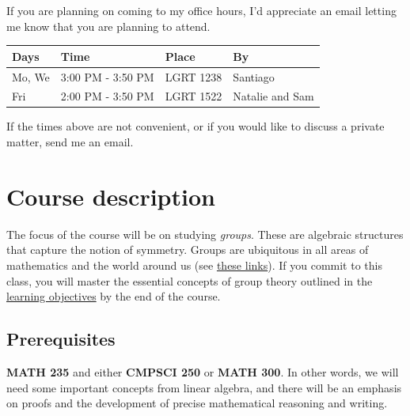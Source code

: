 \documentclass[11pt]{article}
\begin{document}
If you are planning on coming to my office hours, I'd appreciate an email
letting me know that you are planning to attend.

\begin{center}
\begin{tabular}{l|l|l|l}
\hline
Days & Time & Place & By\\[0pt]
\hline
Mo, We & 3:00 PM - 3:50 PM & LGRT 1238 & Santiago\\[0pt]
Fri & 2:00 PM - 3:50 PM & LGRT 1522 & Natalie and Sam\\[0pt]
\hline
\end{tabular}
\end{center}


If the times above are not convenient, or if you would like to discuss a
private matter, send me an email.

\section*{Course description}
\label{sec:org916bda7}
The focus of the course will be on studying \emph{groups}. These are algebraic
structures that capture the notion of symmetry. Groups are ubiquitous in all
areas of mathematics and the world around us (see \hyperref[sec:org7bb381f]{these links}). If you commit
to this class, you will master the essential concepts of group theory outlined
in the \hyperref[sec:org2102cd8]{learning objectives} by the end of the course.
\subsection*{Prerequisites}
\label{sec:org278d2a4}
\textbf{MATH 235} and either \textbf{CMPSCI 250} or \textbf{MATH 300}. In other words, we will need
some important concepts from linear algebra, and there will be an emphasis on
proofs and the development of precise mathematical reasoning and writing.
\end{document}
